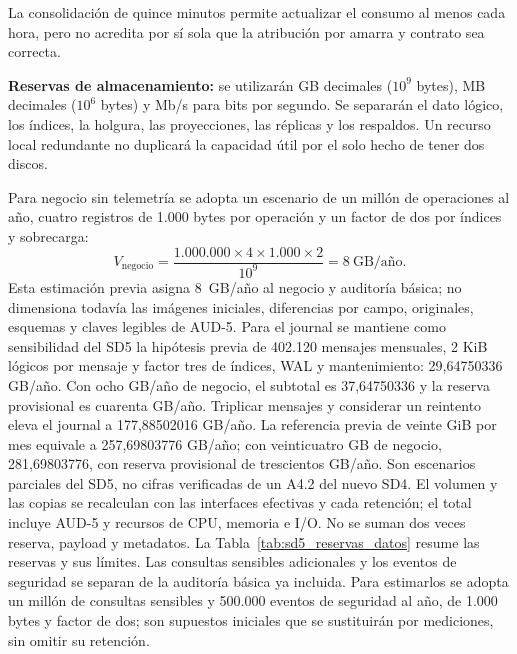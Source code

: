 La consolidación de quince minutos permite actualizar el consumo al menos cada hora, pero no acredita por sí sola que la atribución por amarra y contrato sea correcta.

\textbf{Reservas de almacenamiento:} se utilizarán GB decimales (\(10^9\) bytes), MB decimales (\(10^6\) bytes) y Mb/s para bits por segundo. Se separarán el dato lógico, los índices, la holgura, las proyecciones, las réplicas y los respaldos. Un recurso local redundante no duplicará la capacidad útil por el solo hecho de tener dos discos.

Para negocio sin telemetría se adopta un escenario de un millón de operaciones al año, cuatro registros de 1.000 bytes por operación y un factor de dos por índices y sobrecarga:
\[
V_{\mathrm{negocio}}=
\frac{1.000.000\times4\times1.000\times2}{10^9}
=8\ \mbox{GB/año}.
\]
Esta estimación previa asigna 8~GB/año al negocio y auditoría básica; no dimensiona todavía las imágenes iniciales, diferencias por campo, originales, esquemas y claves legibles de AUD-5. Para el journal se mantiene como sensibilidad del SD5 la hipótesis previa de 402.120 mensajes mensuales, 2 KiB lógicos por mensaje y factor tres de índices, WAL y mantenimiento: 29,64750336 GB/año. Con ocho GB/año de negocio, el subtotal es 37,64750336 y la reserva provisional es cuarenta GB/año. Triplicar mensajes y considerar un reintento eleva el journal a 177,88502016 GB/año. La referencia previa de veinte GiB por mes equivale a 257,69803776 GB/año; con veinticuatro GB de negocio, 281,69803776, con reserva provisional de trescientos GB/año. Son escenarios parciales del SD5, no cifras verificadas de un A4.2 del nuevo SD4. El volumen y las copias se recalculan con las interfaces efectivas y cada retención; el total incluye AUD-5 y recursos de CPU, memoria e I/O. No se suman dos veces reserva, payload y metadatos.
La Tabla~\ref{tab:sd5_reservas_datos} resume las reservas y sus límites. Las consultas sensibles adicionales y los eventos de seguridad se separan de la auditoría básica ya incluida. Para estimarlos se adopta un millón de consultas sensibles y 500.000 eventos de seguridad al año, de 1.000 bytes y factor de dos; son supuestos iniciales que se sustituirán por mediciones, sin omitir su retención.

